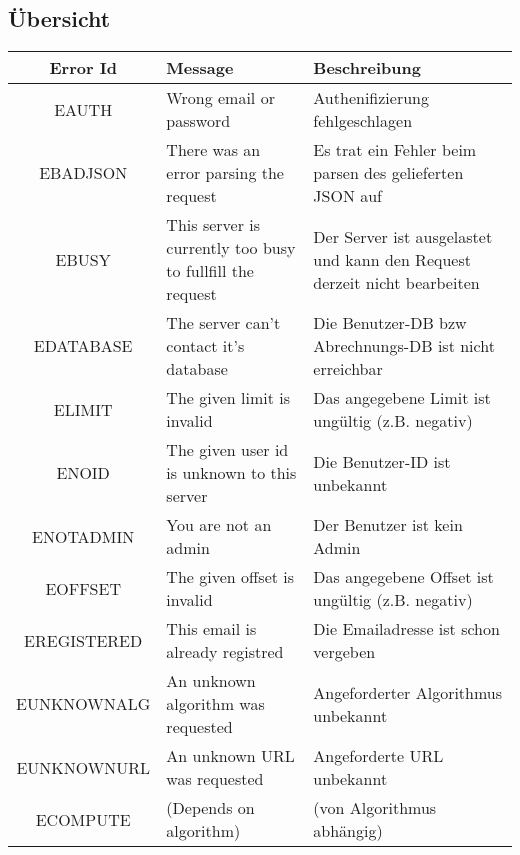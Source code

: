 \documentclass[ngerman,titlepage,parskip=true]{scrartcl}
\begin{document}
\subsection{Übersicht}
\begin{tabular}{|c|p{5cm}|p{5cm}|}
\hline
Error Id	& Message			& Beschreibung \\
\hline
EAUTH		& Wrong email or password	& Authenifizierung fehlgeschlagen \\
\hline
EBADJSON	& There was an error parsing the request & Es trat ein Fehler beim parsen des gelieferten JSON auf \\
\hline
EBUSY		& This server is currently too busy to fullfill the request	& Der Server ist ausgelastet und kann den Request derzeit nicht bearbeiten \\
\hline
EDATABASE	& The server can't contact it's database	& Die Benutzer-DB bzw Abrechnungs-DB ist nicht erreichbar \\
\hline
ELIMIT		& The given limit is invalid			& Das angegebene Limit ist ungültig (z.B. negativ) \\
\hline
ENOID		& The given user id is unknown to this server	& Die Benutzer-ID ist unbekannt \\
\hline
ENOTADMIN	& You are not an admin				& Der Benutzer ist kein Admin \\
\hline
EOFFSET		& The given offset is invalid 			& Das angegebene Offset ist ungültig (z.B. negativ) \\
\hline
EREGISTERED	& This email is already registred	& Die Emailadresse ist schon vergeben \\
\hline
EUNKNOWNALG	& An unknown algorithm was requested	& Angeforderter Algorithmus unbekannt \\
\hline
EUNKNOWNURL	& An unknown URL was requested	& Angeforderte URL unbekannt \\
\hline
ECOMPUTE	& (Depends on algorithm)	& (von Algorithmus abhängig) \\
\hline
\end{tabular}
\end{document}
